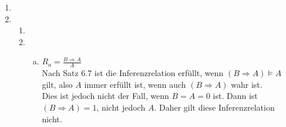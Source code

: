 \documentclass[a4paper,10pt]{scrartcl}
\title{\titleinfo}
\author{Arne Feil}
\date{\today}
\newcommand{\aufgabe}[1]{\item[\textbf{#1}]}
\begin{document}
\begin{enumerate}
\aufgabe{7.3}

\aufgabe{7.4}

\begin{enumerate}[1.]
 \item

 \item
  \begin{enumerate}[a)]
   \item
    $R_a=\frac{B\Rightarrow A}{A}$ \\
    Nach Satz 6.7 ist die Inferenzrelation erfüllt, wenn $(B\Rightarrow A)\vDash A$ gilt, also $A$ immer erfüllt ist, wenn auch $(B\Rightarrow A)$ wahr ist.\\
    Dies ist jedoch nicht der Fall, wenn $B=A=0$ ist. Dann ist $(B\Rightarrow A)=1$, nicht jedoch $A$. Daher gilt diese Inferenzrelation nicht.
  \end{enumerate}
\end{enumerate}



\end{enumerate}
\end{document}

